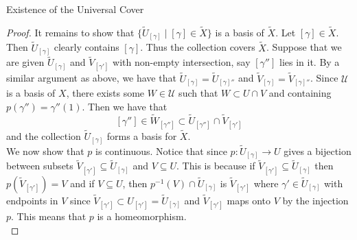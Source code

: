 \documentclass[a4paper]{article}
\begin{document}
\begin{thm}{Existence of the Universal Cover}{}
\begin{proof}
It remains to show that $\{\widetilde{U}_{[\gamma]}\;|\;[\gamma]\in\widetilde{X}\}$ is a basis of $\widetilde{X}$. Let $[\gamma]\in\widetilde{X}$. Then $\widetilde{U}_{[\gamma]}$ clearly contains $[\gamma]$. Thus the collection covers $\widetilde{X}$. Suppose that we are given $\widetilde{U}_{[\gamma]}$ and $\widetilde{V}_{[\gamma']}$ with non-empty intersection, say $[\gamma'']$ lies in it. By a similar argument as above, we have that $\widetilde{U}_{[\gamma]}=\widetilde{U}_{[\gamma]''}$ and $\widetilde{V}_{[\gamma]}=\widetilde{V}_{[\gamma]''}$. Since $\mathcal{U}$ is a basis of $X$, there exists some $W\in\mathcal{U}$ such that $W\subset U\cap V$ and containing $p(\gamma'')=\gamma''(1)$. Then we have that $$[\gamma'']\in\widetilde{W}_{[\gamma'']}\subset\widetilde{U}_{[\gamma'']}\cap\widetilde{V}_{[\gamma']}$$ and the collection $\widetilde{U}_{[\gamma]}$ forms a basis for $\widetilde{X}$. \\

We now show that $p$ is continuous. Notice that since $p:\widetilde{U}_{[\gamma]}\to U$ gives a bijection between subsets $\widetilde{V}_{[\gamma']}\subseteq\widetilde{U}_{[\gamma]}$ and $V\subseteq U$. This is because if $\widetilde{V}_{[\gamma']}\subseteq\widetilde{U}_{[\gamma]}$ then $p\left(\widetilde{V}_{[\gamma']}\right)=V$ and if $V\subseteq U$, then $p^{-1}(V)\cap\widetilde{U}_{[\gamma]}$ is $\widetilde{V}_{[\gamma']}$ where $\gamma'\in\widetilde{U}_{[\gamma]}$ with endpoints in $V$ since $\widetilde{V}_{[\gamma']}\subset U_{[\gamma']}=\widetilde{U}_{[\gamma]}$ and $\widetilde{V}_{[\gamma']}$ maps onto $V$ by the injection $p$. This means that $p$ is a homeomorphism. \\


\end{proof}
\end{thm}
\end{document}

